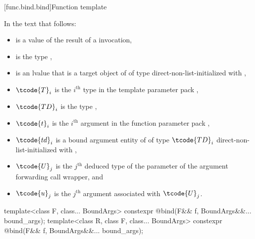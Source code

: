 [func.bind.bind]{Function template }

\pnum
In the text that follows:
\begin{itemize}
\item {} is a value of the result of a  invocation,
\item {} is the type ,
\item {} is an lvalue that
  is a target object of  of type 
  direct-non-list-initialized with ,
\item $\tcode{T}_i$ is the $i^\text{th}$ type in the template parameter pack ,
\item $\tcode{TD}_i$ is the type ,
\item $\tcode{t}_i$ is the $i^\text{th}$ argument in the function parameter pack ,
\item $\tcode{td}_i$ is a bound argument entity
  of  of type $\tcode{TD}_i$
  direct-non-list-initialized with
  ,
\item $\tcode{U}_j$ is the $j^\text{th}$ deduced type of the  parameter
  of the argument forwarding call wrapper, and
\item $\tcode{u}_j$ is the $j^\text{th}$ argument associated with $\tcode{U}_j$.
\end{itemize}

%
\begin{itemdecl}
template<class F, class... BoundArgs>
  constexpr @\unspec@ bind(F&& f, BoundArgs&&... bound_args);
template<class R, class F, class... BoundArgs>
  constexpr @\unspec@ bind(F&& f, BoundArgs&&... bound_args);
\end{itemdecl}

